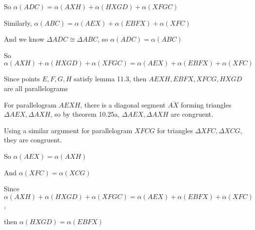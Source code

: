 \documentclass[11pt]{article}
\newcommand{\segment}[1]{\overline{#1}}
\begin{document}
\begin{itemize}
		So $\alpha(ADC) = \alpha(AXH) + \alpha(HXGD) + \alpha(XFGC)$

		Similarly, $\alpha(ABC) = \alpha(AEX) + \alpha(EBFX) + \alpha(XFC)$

		And we know $\Delta ADC \cong \Delta ABC$, so $\alpha(ADC) = \alpha(ABC)$

		So $\alpha(AXH) + \alpha(HXGD) + \alpha(XFGC) = \alpha(AEX) + \alpha(EBFX) + \alpha(XFC)$

		Since points $E,F,G,H$ satisfy lemma 11.3, then $AEXH, EBFX, XFCG, HXGD$ are all parallelograms

		For parallelogram $AEXH$, there is a diagonal segment $\segment{AX}$ forming triangles $\Delta AEX, \Delta AXH$, so by theorem 10.25a, $\Delta AEX, \Delta AXH$ are congruent.

		Using a similar argument for parallelogram $XFCG$ for triangles $\Delta XFC, \Delta XCG$, they are congruent.

		So $\alpha(AEX) = \alpha(AXH)$

		And $\alpha(XFC) = \alpha(XCG)$

		Since $\alpha(AXH) + \alpha(HXGD) + \alpha(XFGC) = \alpha(AEX) + \alpha(EBFX) + \alpha(XFC)$,

		then $\alpha(HXGD) = \alpha(EBFX)$
\end{itemize}
\end{document}
